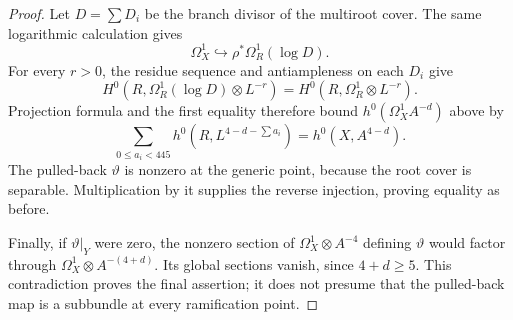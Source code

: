 \begin{proof}
Let $D=\sum D_i$ be the branch divisor of the multiroot cover.  The same logarithmic calculation gives
\[
                       \Omega_X^1\hookrightarrow\rho^*\Omega_R^1(\log D).
\]
For every $r>0$, the residue sequence and antiampleness on each $D_i$ give
\[
 H^0(R,\Omega_R^1(\log D)\otimes L^{-r})
       =H^0(R,\Omega_R^1\otimes L^{-r}).
\]
Projection formula and the first equality therefore bound
$h^0(\Omega_X^1 A^{-d})$ above by
\[
 \sum_{0\leq a_i<445}h^0(R,L^{4-d-\sum a_i})=h^0(X,A^{4-d}).
\]
The pulled-back $\vartheta$ is nonzero at the generic point, because the root cover is separable.  Multiplication by it supplies the reverse injection, proving equality as before.

Finally, if $\vartheta|_Y$ were zero, the nonzero section of $\Omega_X^1\otimes A^{-4}$ defining $\vartheta$ would factor through $\Omega_X^1\otimes A^{-(4+d)}$.  Its global sections vanish, since $4+d\geq5$.  This contradiction proves the final assertion; it does not presume that the pulled-back map is a subbundle at every ramification point.
\end{proof}

